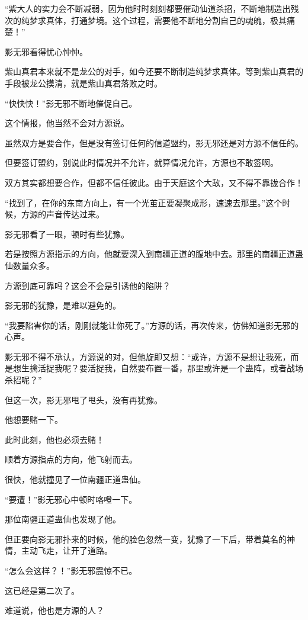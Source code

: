 \begin{this_body}
“紫大人的实力会不断减弱，因为他时时刻刻都要催动仙道杀招，不断地制造出残次的纯梦求真体，打通梦境。这个过程，需要他不断地分割自己的魂魄，极其痛楚！”

影无邪看得忧心忡忡。

紫山真君本来就不是龙公的对手，如今还要不断制造纯梦求真体。等到紫山真君的手段被龙公摸清，就是紫山真君落败之时。

“快快快！”影无邪不断地催促自己。

这个情报，他当然不会对方源说。

虽然双方是要合作，但是没有签订任何的信道盟约，影无邪还是对方源不信任的。

但要签订盟约，别说此时情况并不允许，就算情况允许，方源也不敢签啊。

双方其实都想要合作，但都不信任彼此。由于天庭这个大敌，又不得不靠拢合作！

“找到了，在你的东南方向上，有一个光茧正要凝聚成形，速速去那里。”这个时候，方源的声音传达过来。

影无邪看了一眼，顿时有些犹豫。

若是按照方源指示的方向，他就要深入到南疆正道的腹地中去。那里的南疆正道蛊仙数量众多。

方源到底可靠吗？这会不会是引诱他的陷阱？

影无邪的犹豫，是难以避免的。

“我要陷害你的话，刚刚就能让你死了。”方源的话，再次传来，仿佛知道影无邪的心声。

影无邪不得不承认，方源说的对，但他旋即又想：“或许，方源不是想让我死，而是想生擒活捉我呢？要活捉我，自然要布置一番，那里或许是一个蛊阵，或者战场杀招呢？”

但这一次，影无邪甩了甩头，没有再犹豫。

他想要赌一下。

此时此刻，他也必须去赌！

顺着方源指点的方向，他飞射而去。

很快，他就撞见了一位南疆正道蛊仙。

“要遭！”影无邪心中顿时咯噔一下。

那位南疆正道蛊仙也发现了他。

但正要向影无邪扑来的时候，他的脸色忽然一变，犹豫了一下后，带着莫名的神情，主动飞走，让开了道路。

“怎么会这样？！”影无邪震惊不已。

这已经是第二次了。

难道说，他也是方源的人？


\end{this_body}
